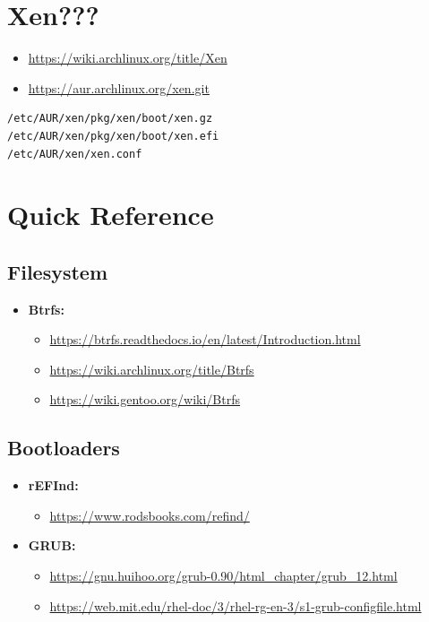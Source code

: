 \documentclass[10pt, a4paper, onecolumn, oneside, titlepage, openany]{book}
\begin{document}
\chapter{Xen???}
\begin{itemize}
    \item \url{https://wiki.archlinux.org/title/Xen}
    \item \url{https://aur.archlinux.org/xen.git}
\end{itemize}
\begin{Verbatim}[commandchars=\\\{\}]
/etc/AUR/xen/pkg/xen/boot/xen.gz
/etc/AUR/xen/pkg/xen/boot/xen.efi
/etc/AUR/xen/xen.conf
\end{Verbatim}        



\chapter{Quick Reference}
\section{Filesystem}
\begin{itemize}
    \item \textbf{Btrfs:}
    \begin{itemize}
        \item \url{https://btrfs.readthedocs.io/en/latest/Introduction.html}
        \item \url{https://wiki.archlinux.org/title/Btrfs}
        \item \url{https://wiki.gentoo.org/wiki/Btrfs}
    \end{itemize}
\end{itemize}

\section{Bootloaders}
\begin{itemize}
    \item \textbf{rEFInd:}
    \begin{itemize}
        \item \url{https://www.rodsbooks.com/refind/}
    \end{itemize}
    \item \textbf{GRUB:}
    \begin{itemize}
        \item \url{https://gnu.huihoo.org/grub-0.90/html_chapter/grub_12.html}
        \item \url{https://web.mit.edu/rhel-doc/3/rhel-rg-en-3/s1-grub-configfile.html}
    \end{itemize}
\end{itemize}
\end{document}
